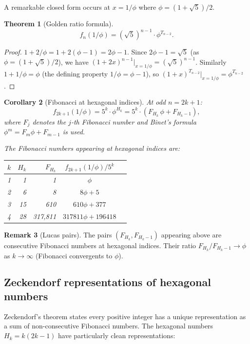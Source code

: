 \documentclass[12pt,reqno]{amsart}
\newtheorem{theorem}{Theorem}[section]
\newtheorem{corollary}[theorem]{Corollary}
\theoremstyle{definition}
\newtheorem{remark}[theorem]{Remark}
\theoremstyle{plain}
\begin{document}
A remarkable closed form occurs at $x=1/\phi$ where $\phi=(1+\sqrt5)/2$.

\begin{theorem}[Golden ratio formula]\label{thm:golden}
\[
  f_n(1/\phi)=(\sqrt{5})^{n-1}\cdot\phi^{T_{n-2}}.
\]
\end{theorem}

\begin{proof}
$1+2/\phi=1+2(\phi-1)=2\phi-1$.  Since $2\phi-1=\sqrt{5}$
(as $\phi=(1+\sqrt5)/2$), we have $(1+2x)^{n-1}|_{x=1/\phi}=(\sqrt5)^{n-1}$.
Similarly $1+1/\phi=\phi$ (the defining property $1/\phi=\phi-1$),
so $(1+x)^{T_{n-2}}|_{x=1/\phi}=\phi^{T_{n-2}}$.
\end{proof}

\begin{corollary}[Fibonacci at hexagonal indices]\label{cor:fib-hex}
At odd $n=2k+1$:
\[
  f_{2k+1}(1/\phi)=5^k\cdot\phi^{H_k}=5^k\cdot(F_{H_k}\,\phi+F_{H_k-1}),
\]
where $F_j$ denotes the $j$-th Fibonacci number and Binet's formula
$\phi^m=F_m\phi+F_{m-1}$ is used.

The Fibonacci numbers appearing at hexagonal indices are:
\begin{center}
\begin{tabular}{crrcc}
\toprule
$k$ & $H_k$ & $F_{H_k}$ & $f_{2k+1}(1/\phi)/5^k$ \\
\midrule
1 & 1   & 1           & $\phi$ \\
2 & 6   & 8           & $8\phi+5$ \\
3 & 15  & 610         & $610\phi+377$ \\
4 & 28  & 317{,}811   & $317811\phi+196418$ \\
\bottomrule
\end{tabular}
\end{center}
\end{corollary}

\begin{remark}[Lucas pairs]
The pairs $(F_{H_k}, F_{H_k-1})$ appearing above are consecutive Fibonacci
numbers at hexagonal indices.  Their ratio $F_{H_k}/F_{H_k-1}\to\phi$ as
$k\to\infty$ (Fibonacci convergents to $\phi$).
\end{remark}

\subsection{Zeckendorf representations of hexagonal numbers}
\label{ssec:zeckendorf}

Zeckendorf's theorem states every positive integer has a unique representation
as a sum of non-consecutive Fibonacci numbers.  The hexagonal numbers
$H_k=k(2k-1)$ have particularly clean representations:
\end{document}
